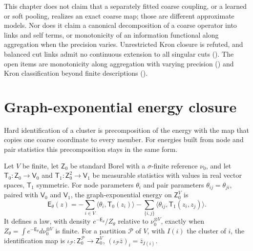 This chapter does not claim that a separately fitted coarse coupling, or a
learned or soft pooling, realizes an exact coarse map; those are different
approximate models. Nor does it claim a canonical decomposition of a coarse
operator into links and self terms, or monotonicity of an information
functional along aggregation when the precision varies. Unrestricted Kron
closure is refuted, and balanced cut links admit no continuous extension to all singular cuts
(). The open items are monotonicity along aggregation with
varying precision () and Kron
classification beyond finite descriptions
(). 

\section{Graph-exponential energy closure}
\label{sec:cg-graph-exponential}

Hard identification of a cluster is precomposition of the energy with the map
that copies one coarse coordinate to every member. For energies built from node
and pair statistics this precomposition stays in the same form.

Let \(V\) be finite, let \(\mathsf Z_0\) be standard Borel with a
\(\sigma\)-finite reference \(\nu_0\), and let
\(\mathsf T_0:\mathsf Z_0\to\mathsf V_0\) and \(\mathsf T_1:\mathsf Z_0^2\to\mathsf V_1\) be
measurable statistics with values in real vector spaces, \(\mathsf T_1\) symmetric.
For node parameters \(\theta_i\) and pair parameters
\(\theta_{ij}=\theta_{ji}\), paired with \(\mathsf V_0\) and \(\mathsf V_1\),
the graph-exponential energy on \(\mathsf Z_0^V\) is
\begin{equation}
\mathsf E_\theta(z)
=-\sum_{i\in V}\langle\theta_i,\mathsf T_0(z_i)\rangle
-\sum_{\{i,j\}}\langle\theta_{ij},\mathsf T_1(z_i,z_j)\rangle .
\label{eq:cg-graph-energy}
\end{equation}
It defines a law, with density \(e^{-\mathsf E_\theta}/Z_\theta\) relative to
\(\nu_0^{\otimes V}\), exactly when
\(Z_\theta=\int e^{-\mathsf E_\theta}d\nu_0^{\otimes V}\) is finite. For a
partition \(\mathcal P\) of \(V\), with \(I(i)\) the cluster of \(i\), the
identification map is
\(\iota_{\mathcal P}:\mathsf Z_0^{\mathcal P}\to\mathsf Z_0^V\),
\((\iota_{\mathcal P}\bar z)_i=\bar z_{I(i)}\).

